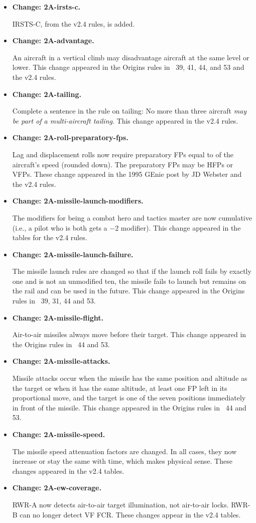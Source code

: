 \documentclass[10pt]{report}
\newcommand{\itemtag}[1]{\item \textbf{Change: #1.}\par}
\begin{document}
\begin{itemize}
    \itemtag{2A-irsts-c} IRSTS-C, from the v2.4 rules, is added.

    \itemtag{2A-advantage} An aircraft in a vertical climb may disadvantage aircraft at the same level or lower. This change appeared in the Origins rules in {\APJ}~39, 41, 44, and 53 and the v2.4 rules.
    
    \itemtag{2A-tailing} Complete a sentence in the rule on tailing: No more than three aircraft \emph{may be part of a multi-aircraft tailing}. This change appeared in the v2.4 rules.

    \itemtag{2A-roll-preparatory-fps} Lag and displacement rolls now require preparatory FPs equal to {\onethird} of the aircraft's speed (rounded down). The preparatory FPs may be HFPs or VFPs. These change appeared in the 1995 GEnie post by JD Webster and the v2.4 rules.
    
    \itemtag{2A-missile-launch-modifiers} The modifiers for being a combat hero and tactics master are now cumulative (i.e., a pilot who is both gets a $-2$ modifier). This change appeared in the tables for the v2.4 rules.
    
    \itemtag{2A-missile-launch-failure} The missile launch rules are changed so that if the launch roll fails by exactly one and is not an unmodified ten, the missile fails to launch but remains on the rail and can be used in the future. This change appeared in the Origins rules in \APJ~39, 31, 44 and 53.

    \itemtag{2A-missile-flight} Air-to-air missiles always move before their target. This change appeared in the Origins rules in \APJ~44 and 53.

    \itemtag{2A-missile-attacks} Missile attacks occur when the missile has the same position and altitude as the target or when it has the same altitude, at least one FP left in its proportional move, and the target is one of the seven positions immediately in front of the missile. This change appeared in the Origins rules in \APJ~44 and 53.

    \itemtag{2A-missile-speed} The missile speed attenuation factors are changed. In all cases, they now increase or stay the same with time, which makes physical sense. These changes appeared in the v2.4 tables.

    \itemtag{2A-ew-coverage} RWR-A now detects air-to-air target illumination, not air-to-air locks. RWR-B can no longer detect VF FCR. These changes appear in the v2.4 tables.
    
\end{itemize}
\end{document}
